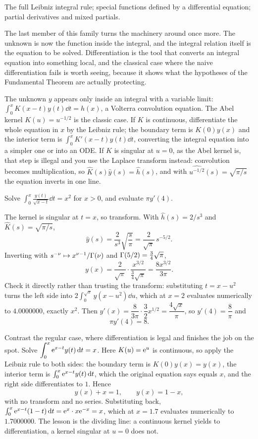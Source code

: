 \begin{seealsob}The full Leibniz integral rule; special functions defined by a differential equation; partial derivatives and mixed partials.\end{seealsob}

The last member of this family turns the machinery around once more. The unknown is now the function inside the integral, and the integral relation itself is the equation to be solved. Differentiation is the tool that converts an integral equation into something local, and the classical case where the naive differentiation fails is worth seeing, because it shows what the hypotheses of the Fundamental Theorem are actually protecting.

\cue The unknown $y$ appears only inside an integral with a variable limit: $\int_{0}^{x}K(x-t)y(t)\dd t=h(x)$, a Volterra convolution equation. The Abel kernel $K(u)=u^{-1/2}$ is the classic case.
\method If $K$ is continuous, differentiate the whole equation in $x$ by the Leibniz rule; the boundary term is $K(0)y(x)$ and the interior term is $\int_{0}^{x}K'(x-t)y(t)\dd t$, converting the integral equation into a simpler one or into an ODE. If $K$ is singular at $u=0$, as the Abel kernel is, that step is illegal and you use the Laplace transform instead: convolution becomes multiplication, so $\widehat K(s)\widehat y(s)=\widehat h(s)$, and with $\widehat{u^{-1/2}}(s)=\sqrt{\pi/s}$ the equation inverts in one line.

\begin{worked}
Solve $\displaystyle\int_{0}^{x}\frac{y(t)}{\sqrt{x-t}}\dd t=x^{2}$ for $x>0$, and evaluate $\pi y'(4)$.

The kernel is singular at $t=x$, so transform. With $\widehat h(s)=2/s^{3}$ and $\widehat K(s)=\sqrt{\pi/s}$,
\[
\widehat y(s)=\frac{2}{s^{3}}\sqrt{\frac{s}{\pi}}=\frac{2}{\sqrt\pi}\,s^{-5/2}.
\]
Inverting with $s^{-\nu}\mapsto x^{\nu-1}/\Gamma(\nu)$ and $\Gamma(5/2)=\tfrac34\sqrt\pi$,
\[
y(x)=\frac{2}{\sqrt\pi}\cdot\frac{x^{3/2}}{\tfrac34\sqrt\pi}=\frac{8x^{3/2}}{3\pi}.
\]
Check it directly rather than trusting the transform: substituting $t=x-u^{2}$ turns the left side into $2\int_{0}^{\sqrt x}y(x-u^{2})\dd u$, which at $x=2$ evaluates numerically to $4.0000000$, exactly $x^{2}$. Then $y'(x)=\dfrac{8}{3\pi}\cdot\dfrac32 x^{1/2}=\dfrac{4\sqrt x}{\pi}$, so $y'(4)=\dfrac{8}{\pi}$ and
\[
\pi y'(4)=8 .
\]

Contrast the regular case, where differentiation is legal and finishes the job on the spot. Solve $\displaystyle\int_{0}^{x}\mathrm{e}^{x-t}y(t)\,\mathrm{d} t=x$. Here $K(u)=\mathrm{e}^{u}$ is continuous, so apply the Leibniz rule to both sides: the boundary term is $K(0)y(x)=y(x)$, the interior term is $\int_{0}^{x}\mathrm{e}^{x-t}y(t)\,\mathrm{d} t$, which the original equation says equals $x$, and the right side differentiates to $1$. Hence
\[
y(x)+x=1,\qquad y(x)=1-x ,
\]
with no transform and no series. Substituting back, $\int_{0}^{x}\mathrm{e}^{x-t}(1-t)\,\mathrm{d} t=\mathrm{e}^{x}\cdot x\mathrm{e}^{-x}=x$, which at $x=1.7$ evaluates numerically to $1.7000000$. The lesson is the dividing line: a continuous kernel yields to differentiation, a kernel singular at $u=0$ does not.
\end{worked}

